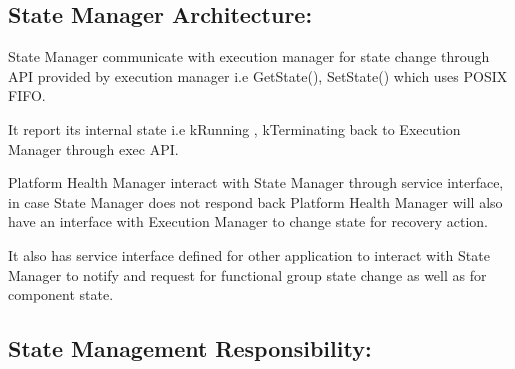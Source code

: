 \subsection*{State Manager Architecture\+:}


\begin{DoxyItemize}
\item State Manager communicate with execution manager for state change through A\+PI provided by execution manager i.\+e Get\+State(), Set\+State() which uses P\+O\+S\+IX F\+I\+FO.
\item It report its internal state i.\+e k\+Running , k\+Terminating back to Execution Manager through exec A\+PI.
\item Platform Health Manager interact with State Manager through service interface, in case State Manager does not respond back Platform Health Manager will also have an interface with Execution Manager to change state for recovery action.
\item It also has service interface defined for other application to interact with State Manager to notify and request for functional group state change as well as for component state.
\end{DoxyItemize}

\subsection*{State Management Responsibility\+:}


